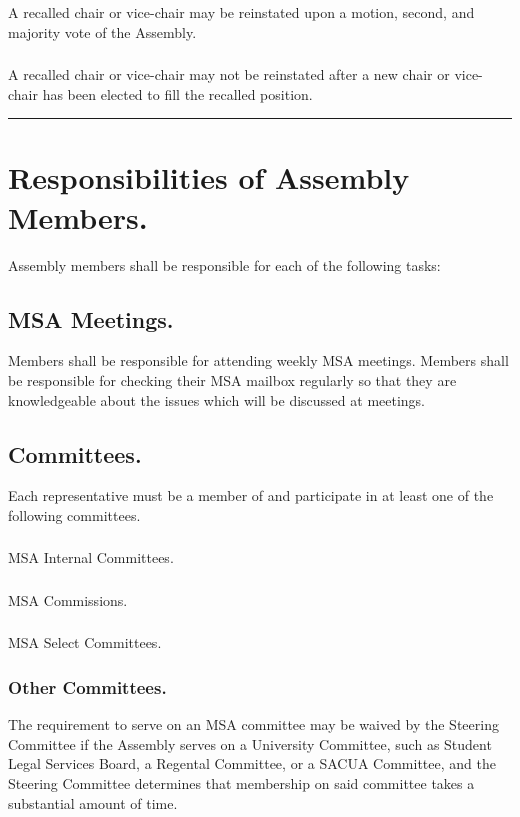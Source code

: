 \documentclass{rules}
\begin{document}
\subsubsection{}
A recalled chair or vice-chair may be reinstated upon a motion, second, and majority vote of the Assembly.
\subsubsection{}
A recalled chair or vice-chair may not be reinstated after a new chair or vice-chair has been elected to fill the recalled position. 


\rule{Member Obligations}


\section{Responsibilities of Assembly Members.}
Assembly members shall be responsible for each of the following tasks:
\subsection{MSA Meetings.}
Members shall be responsible for attending weekly MSA meetings. Members shall be responsible for checking their MSA mailbox regularly so that they are knowledgeable about the issues which will be discussed at meetings.
\subsection{Committees.}
Each representative must be a member of and participate in at least one of the following committees.
\subsubsection{}
MSA Internal Committees.
\subsubsection{}
MSA Commissions.
\subsubsection{}
MSA Select Committees.
\subsubsection{Other Committees.}
The requirement to serve on an MSA committee may be waived by the Steering Committee if the Assembly serves on a University Committee, such as Student Legal Services Board, a Regental Committee, or a SACUA Committee, and the Steering Committee determines that membership on said committee takes a substantial amount of time.
\end{document}
